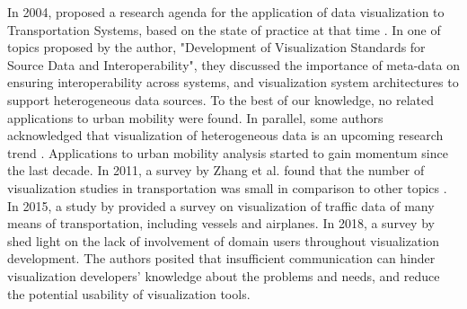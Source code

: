 \documentclass[]{interact}
\theoremstyle{plain}%
\theoremstyle{definition}
\theoremstyle{remark}
\theoremstyle{definition}
\begin{document}
In 2004, \citet{Hughes2005} proposed a research agenda for the application of data visualization to Transportation Systems, based on the state of practice at that time . In one of topics proposed by the author, "Development of Visualization Standards for Source Data and Interoperability", they discussed the importance of meta-data on ensuring interoperability across systems, and visualization system architectures to support heterogeneous data sources. To the best of our knowledge, no related applications to urban mobility were found. In parallel, some authors acknowledged that visualization of heterogeneous data is an upcoming research trend \citep{Zhang2011}. Applications to urban mobility analysis started to gain momentum since the last decade. In 2011, a survey by Zhang et al. found that the number of visualization studies in transportation was small in comparison to other topics \citep{Zhang2011}. In 2015, a study by \citet{Chen2015} provided a survey on visualization of traffic data of many means of transportation, including vessels and airplanes. In 2018, a survey by \citet{andrienko2018} shed light on the lack of involvement of domain users throughout visualization development. The authors posited that insufficient communication can hinder visualization developers' knowledge about the problems and needs, and reduce the potential usability of visualization tools.





\end{document}
